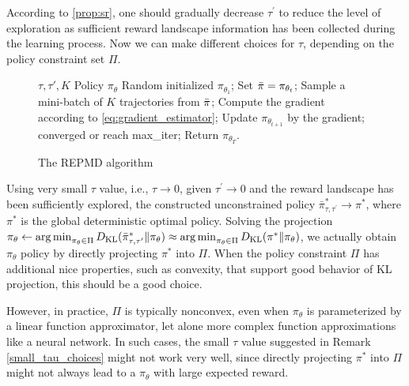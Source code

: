 \documentclass{article} %
\begin{document}
According to \cref{prop:sr}, one should gradually decrease $\tau^{\prime}$ to reduce the level of exploration as sufficient reward landscape information has been collected during the learning process. Now we can make different choices for $\tau$, depending on the policy constraint set $\Pi$.

\begin{figure}
\begin{minipage}{0.56\textwidth}
\begin{algorithm}[H]
\caption{\label{alg:repmd}  The REPMD algorithm}
\begin{algorithmic}[1]
  \INPUT $\tau, \tau', K$
  \OUTPUT  Policy $\pi_\theta$
  \STATE Random initialized $\pi_{\theta_1}$;
  \STATE Set $\bar{\pi} = \pi_{\theta_t}$;
  \REPEAT 
  \STATE Sample a mini-batch of $K$ trajectories from $\bar{\pi}$;
  \STATE Compute the gradient according to \cref{eq:gradient_estimator};
  \STATE Update $\pi_{\theta_{t+1}}$ by the gradient;
  \UNTIL converged or reach max\_iter;
  \ENDFOR
  \STATE Return $\pi_{\theta_T}$.
\end{algorithmic}
\end{algorithm}
\end{minipage}
\end{figure}

\begin{remk}
\label{small_tau_choices}
Using very small $\tau$ value, i.e., $\tau \to 0$, given $\tau^{\prime} \to 0$ and the reward landscape has been sufficiently explored, the constructed unconstrained policy $\bar{\pi}_{\tau,\tau^{\prime}}^* \to \pi^*$, where $\pi^*$ is the global deterministic optimal policy. Solving the projection $\pi_\theta \leftarrow \operatorname*{arg\,min}_{\pi_\theta \in \Pi}{D_{\mathrm{KL}}(\bar{\pi}_{\tau,\tau^{\prime}}^* \| \pi_\theta}) \approx \operatorname*{arg\,min}_{\pi_\theta \in \Pi}{D_{\mathrm{KL}}(\pi^* \| \pi_\theta})$, we actually obtain $\pi_\theta$ policy by directly projecting $\pi^*$ into $\Pi$. When the policy constraint $\Pi$ has additional nice properties, such as convexity, that support good behavior of KL projection, this should be a good choice.
\end{remk}
  
However, in practice, $\Pi$ is typically nonconvex, even when $\pi_\theta$ is parameterized by a linear function approximator, let alone more complex function approximations like a neural network. In such cases, the small $\tau$ value suggested in Remark \ref{small_tau_choices} might not work very well, since directly projecting $\pi^*$ into $\Pi$ might not always lead to a $\pi_\theta$ with large expected reward.
\end{document}
